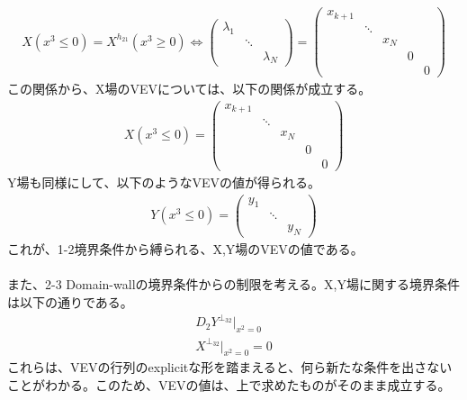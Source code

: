 \documentclass[dvipdfmx,a4paper,10.5pt]{article}
\numberwithin{equation}{section}
\begin{document}
\begin{enumerate}
\begin{align*}
    X(x^{3}\leq 0)=X^{h_{21}}(x^{3}\geq 0)
    \iff
    \begin{pmatrix}
        \lambda_1 &        &          \\
    & \ddots &          \\
    &        & \lambda_N  
    \end{pmatrix}
    =
    \begin{pmatrix}
x_{k+1} &        &        &        &  \\
    & \ddots &        &        &   \\
    &        & x_N    &        &   \\
    &        &        & 0      &   \\
   &        &        &        & 0
\end{pmatrix}
\end{align*}
この関係から、X場のVEVについては、以下の関係が成立する。
\begin{align*}
 X(x^{3}\leq 0)=\begin{pmatrix}
x_{k+1} &        &        &        &  \\
    & \ddots &        &        &   \\
    &        & x_N    &        &   \\
    &        &        & 0      &   \\
   &        &        &        & 0
\end{pmatrix}
\end{align*}
Y場も同様にして、以下のようなVEVの値が得られる。
\begin{align*}
    Y(x^{3}\leq 0)=\begin{pmatrix}
        y_1 &        &          \\
    & \ddots &          \\
    &        & y_N  
    \end{pmatrix}
\end{align*}
これが、1-2境界条件から縛られる、X,Y場のVEVの値である。\\
\\
また、2-3 Domain-wallの境界条件からの制限を考える。X,Y場に関する境界条件は以下の通りである。
\begin{align*}
    D_{2}Y^{\perp_{32}}|_{x^{2}=0}\\
    X^{\perp_{32}}|_{x^{2}=0}=0
\end{align*}
これらは、VEVの行列のexplicitな形を踏まえると、何ら新たな条件を出さないことがわかる。このため、VEVの値は、上で求めたものがそのまま成立する。\\

\end{enumerate}
\end{document}
